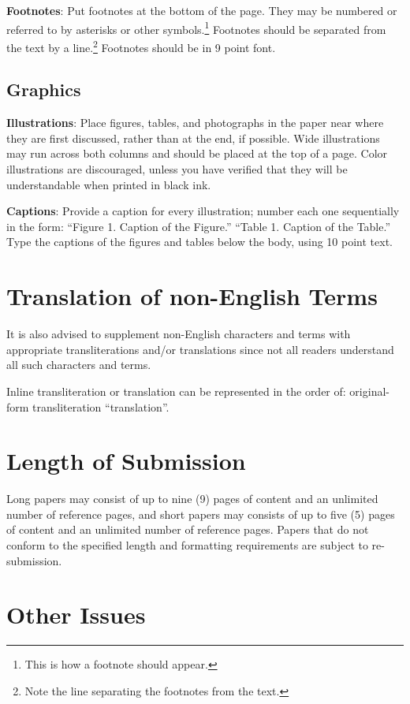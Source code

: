 \documentclass[11pt]{article}
\begin{document}
{\bf Footnotes}: Put footnotes at the bottom of the page. They may
be numbered or referred to by asterisks or other
symbols.\footnote{This is how a footnote should appear.} Footnotes
should be separated from the text by a line.\footnote{Note the
line separating the footnotes from the text.}  Footnotes should be in 9 point font.

\subsection{Graphics}

{\bf Illustrations}: Place figures, tables, and photographs in the
paper near where they are first discussed, rather than at the end, if
possible.  Wide illustrations may run across both columns and should be placed at
the top of a page. Color illustrations are discouraged, unless you have verified that
they will be understandable when printed in black ink.

{\bf Captions}: Provide a caption for every illustration; number each one
sequentially in the form:  ``Figure 1. Caption of the Figure.'' ``Table 1.
Caption of the Table.''  Type the captions of the figures and
tables below the body, using 10 point text.

\section{Translation of non-English Terms}

It is also advised to supplement non-English characters and terms
with appropriate transliterations and/or translations
since not all readers understand all such characters and terms.

Inline transliteration or translation can be represented in
the order of: original-form transliteration ``translation''.

\section{Length of Submission}
\label{sec:length}

Long papers may consist of up to nine (9) pages of content and an unlimited number of reference pages, 
and short papers may consists of up to five (5) pages of content and an unlimited number of reference pages. 
Papers that do not conform to the specified length and formatting requirements are subject to re-submission.

\section{Other Issues}
 
\end{document}
